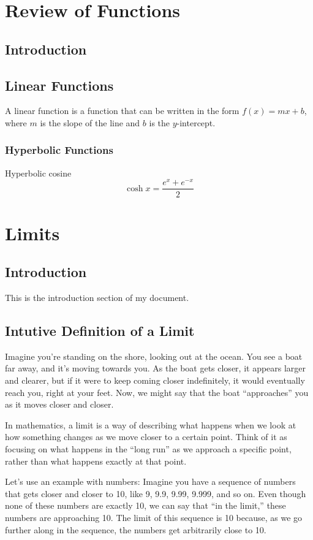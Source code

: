 \chapter{Review of Functions}
\section{Introduction}


\section{Linear Functions}
A linear function is a function that can be written in the form $f(x) = mx + b$, where $m$ is the slope of the line and $b$ is the $y$-intercept.

\subsection{Hyperbolic Functions}

Hyperbolic cosine 
\begin{equation}
	\cosh x = \frac{e^x + e^{-x}}{2}
\end{equation}

\chapter{Limits}
\section{Introduction}
This is the introduction section of my document.
\section{Intutive Definition of a Limit}
Imagine you’re standing on the shore, looking out at the ocean. You see a boat far away, and it’s moving towards you. As the boat gets closer, it appears larger and clearer, but if it were to keep coming closer indefinitely, it would eventually reach you, right at your feet. Now, we might say that the boat “approaches” you as it moves closer and closer.

In mathematics, a limit is a way of describing what happens when we look at how something changes as we move closer to a certain point. Think of it as focusing on what happens in the “long run” as we approach a specific point, rather than what happens exactly at that point.

Let’s use an example with numbers: Imagine you have a sequence of numbers that gets closer and closer to 10, like 9, 9.9, 9.99, 9.999, and so on. Even though none of these numbers are exactly 10, we can say that “in the limit,” these numbers are approaching 10. The limit of this sequence is 10 because, as we go further along in the sequence, the numbers get arbitrarily close to 10.

